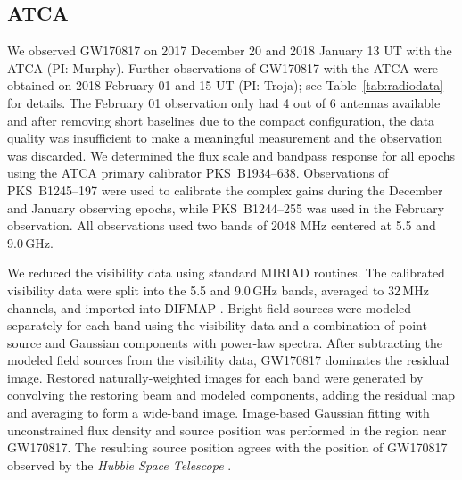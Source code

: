 
\subsection{ATCA} \label{subsec:atca}

We observed GW170817 on 2017 December 20 and 2018 January 13 UT with the ATCA (PI: Murphy). Further observations of GW170817 with the ATCA were obtained on 2018 February 01 and 15 UT (PI: Troja); see Table~\ref{tab:radiodata} for details. The February 01 observation only had 4 out of 6 antennas available and after removing short baselines due to the compact configuration, the data quality was insufficient to make a meaningful measurement and the observation was discarded. We determined the flux scale and bandpass response for all epochs using the ATCA primary calibrator PKS~B1934--638. Observations of PKS~B1245--197 were used to calibrate the complex gains during the December and January observing epochs, while PKS~B1244--255 was used in the February observation. All observations used two bands of 2048 MHz centered at 5.5 and 9.0\,GHz. 

We reduced the visibility data using standard MIRIAD \citep{1995ASPC...77..433S} routines. The calibrated visibility data were split into the 5.5 and 9.0\,GHz bands, averaged to 32\,MHz channels, and imported into DIFMAP \citep{1997ASPC..125...77S}. Bright field sources were modeled separately for each band using the visibility data and a combination of point-source and Gaussian components with power-law spectra. After subtracting the modeled field sources from the visibility data, GW170817 dominates the residual image. Restored naturally-weighted images for each band were generated by convolving the restoring beam and modeled components, adding the residual map and averaging to form a wide-band image. Image-based Gaussian fitting with unconstrained flux density and source position was performed in the region near GW170817. The resulting source position agrees with the position of GW170817 observed by the \textit{Hubble Space Telescope} \citep[HST,][]{GCN21816}.


